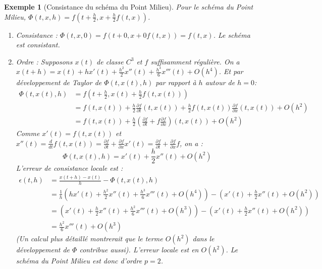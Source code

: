 \documentclass{article}
\newtheorem{example}{Exemple}
\begin{document}
\begin{example}[Consistance du schéma du Point Milieu]
Pour le schéma du Point Milieu, $\Phi(t, x, h) = f\left(t + \frac{h}{2}, x + \frac{h}{2} f(t, x)\right)$.
\begin{enumerate}
    \item Consistance : $\Phi(t, x, 0) = f(t + 0, x + 0 f(t, x)) = f(t, x)$. Le schéma est consistant.
    \item Ordre : Supposons $x(t)$ de classe $C^3$ et $f$ suffisamment régulière.
    On a $x(t+h) = x(t) + h x'(t) + \frac{h^2}{2} x''(t) + \frac{h^3}{6} x'''(t) + O(h^4)$.
    Et par développement de Taylor de $\Phi(t, x(t), h)$ par rapport à $h$ autour de $h=0$:
    \begin{align*} \Phi(t, x(t), h) &= f\left(t + \frac{h}{2}, x(t) + \frac{h}{2} f(t, x(t))\right) \\ &= f(t, x(t)) + \frac{h}{2} \frac{\partial f}{\partial t}(t, x(t)) + \frac{h}{2} f(t, x(t)) \frac{\partial f}{\partial x}(t, x(t)) + O(h^2) \\ &= f(t, x(t)) + \frac{h}{2} \left( \frac{\partial f}{\partial t} + f \frac{\partial f}{\partial x} \right)(t, x(t)) + O(h^2) \end{align*}
    Comme $x'(t) = f(t, x(t))$ et $x''(t) = \frac{d}{dt}f(t, x(t)) = \frac{\partial f}{\partial t} + \frac{\partial f}{\partial x} x'(t) = \frac{\partial f}{\partial t} + \frac{\partial f}{\partial x} f$, on a :
    \begin{equation*}
    \Phi(t, x(t), h) = x'(t) + \frac{h}{2} x''(t) + O(h^2)
    \end{equation*}
    L'erreur de consistance locale est :
    \begin{align*} \epsilon(t, h) &= \frac{x(t+h) - x(t)}{h} - \Phi(t, x(t), h) \\ &= \frac{1}{h} \left( h x'(t) + \frac{h^2}{2} x''(t) + \frac{h^3}{6} x'''(t) + O(h^4) \right) - \left( x'(t) + \frac{h}{2} x''(t) + O(h^2) \right) \\ &= \left( x'(t) + \frac{h}{2} x''(t) + \frac{h^2}{6} x'''(t) + O(h^3) \right) - \left( x'(t) + \frac{h}{2} x''(t) + O(h^2) \right) \\ &= \frac{h^2}{6} x'''(t) + O(h^3) \end{align*}
    (Un calcul plus détaillé montrerait que le terme $O(h^2)$ dans le développement de $\Phi$ contribue aussi).
    L'erreur locale est en $O(h^2)$. Le schéma du Point Milieu est donc d'ordre $p=2$.
\end{enumerate}
\end{example}
\end{document}

